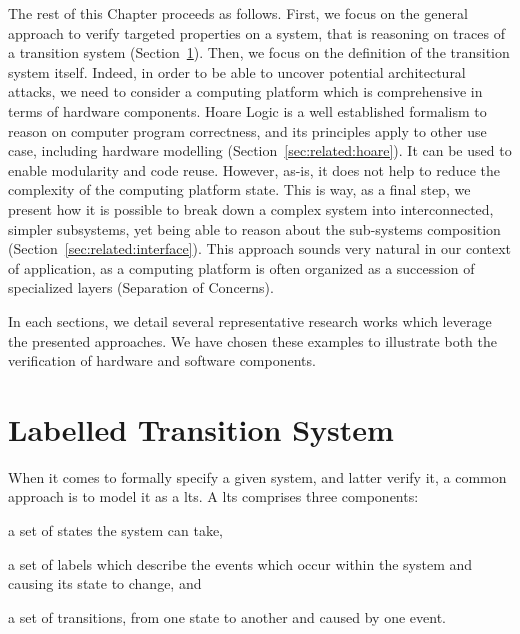 The rest of this Chapter proceeds as follows.
%
First, we focus on the general approach to verify targeted properties on a
system, that is reasoning on traces of a transition system
(Section~\ref{sec:related:lts}).
%
Then, we focus on the definition of the transition system itself.
%
Indeed, in order to be able to uncover potential architectural attacks, we need
to consider a computing platform which is comprehensive in terms of hardware
components.
%
Hoare Logic is a well established formalism to reason on computer program
correctness, and its principles apply to other use case, including hardware
modelling (Section~\ref{sec:related:hoare}).
%
It can be used to enable modularity and code reuse.
%
However, as-is, it does not help to reduce the complexity of the computing
platform state.
%
This is way, as a final step, we present how it is possible to break down a
complex system into interconnected, simpler subsystems, yet being able to reason
about the sub-systems composition (Section~\ref{sec:related:interface}).
%
This approach sounds very natural in our context of application, as a computing
platform is often organized as a succession of specialized layers (Separation of
Concerns).

In each sections, we detail several representative research works which leverage
the presented approaches.
%
We have chosen these examples to illustrate both the verification of hardware
and software components.

\section{Labelled Transition System} %
\label{sec:related:lts}

When it comes to formally specify a given system, and latter verify it, a common
approach is to model it as a \ac{lts}.
%
A \ac{lts} comprises three components:
%
\begin{inparaenum}[(1)]
%
\item a set of states the system can take,
%
\item a set of labels which describe the events which occur within the system
  and causing its state to change, and
%
\item a set of transitions, from one state to another and caused by one event.
%
\end{inparaenum}


